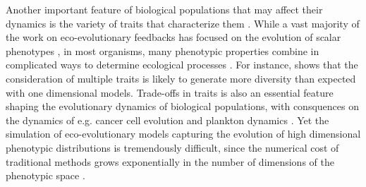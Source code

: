 Another important feature of biological populations that may affect their dynamics is the variety of traits that characterize them \citep{Doebeli2011}. While a vast majority of the work on eco-evolutionary feedbacks has focused on the evolution of scalar phenotypes \citep{Doebeli2011}, in most organisms, many phenotypic properties combine in complicated ways to determine ecological processes \citep{Doebeli2014}.
% 
For instance, \cite{Doebeli2011} shows that the consideration of multiple traits is likely to generate more diversity than expected with one dimensional models.
% 
% 
Trade-offs in traits is also an essential feature shaping the evolutionary dynamics of biological populations, with consquences on the dynamics of e.g. cancer cell evolution \citep{Fiandaca2021} and plankton dynamics \citep{LeGland2020}.
% 
Yet the simulation of eco-evolutionary models capturing the evolution of high dimensional phenotypic distributions is tremendously difficult, since the numerical cost of traditional methods grows exponentially in the number of dimensions of the phenotypic space \citep{Bellman1957}. 
% 

